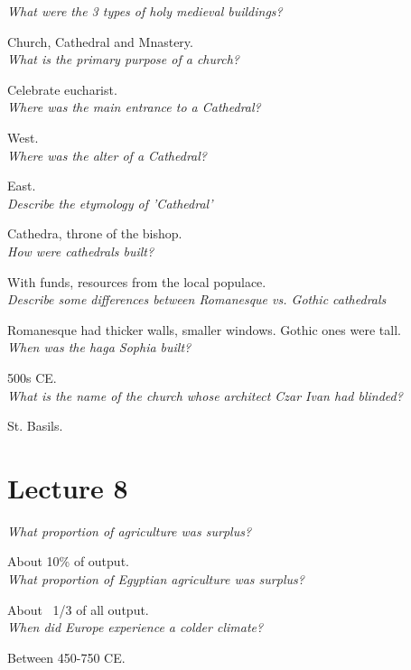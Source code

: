 \documentclass[12pt]{article}
\begin{document}
\textit{What were the 3 types of holy medieval buildings?}

Church, Cathedral and Mnastery.\\

\textit{What is the primary purpose of a church?}

Celebrate eucharist.\\

\textit{Where was the main entrance to a Cathedral?}

West.\\

\textit{Where was the alter of a Cathedral?}

East.\\

\textit{Describe the etymology of 'Cathedral'}

Cathedra, throne of the bishop.\\

\textit{How were cathedrals built?}

With funds, resources from the local populace.\\

\textit{Describe some differences between Romanesque vs. Gothic cathedrals}

Romanesque had thicker walls, smaller windows. Gothic ones were tall.\\

\textit{When was the haga Sophia built?}

500s CE.\\

\textit{What is the name of the church whose architect Czar Ivan had blinded?}

St. Basils.\\

\section*{Lecture 8}

\textit{What proportion of agriculture was surplus?}

About 10\% of output.\\

\textit{What proportion of Egyptian agriculture was surplus?}

About ~1/3 of all output.\\

\textit{When did Europe experience a colder climate?}

Between 450-750 CE.\\
\end{document}
